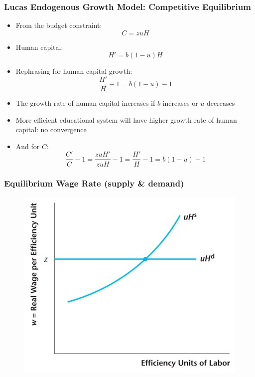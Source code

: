 \documentclass{beamer}
\begin{document}
\begin{frame}
\frametitle[alignment=center]{Lucas Endogenous Growth Model: Competitive Equilibrium}
\begin{itemize}
\item From the budget constraint:
$$C=zuH$$
\item Human capital:
$$H'=b(1-u)H$$
\item Rephrasing for human capital growth:
$$\frac{H'}{H}-1=b(1-u)-1$$
\item The growth rate of human capital increases if $b$ increases or $u$ decreases
\bigskip
\item More efficient educational system will have higher growth rate of human capital: no convergence
\bigskip
\item And for $C$:
$$\frac{C'}{C}-1=\frac{zuH'}{zuH}-1=\frac{H'}{H}-1=b(1-u)-1$$
\end{itemize}
\end{frame}

\begin{frame}
\frametitle[alignment=center]{Equilibrium Wage Rate (supply \& demand) }
\begin{figure}
\centering
\includegraphics[scale=0.5]{Figures/W_Fig_8pt5.png}
\end{figure}
\end{frame}
\end{document}
